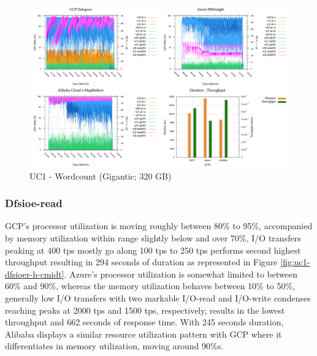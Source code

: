 \documentclass[review]{elsarticle}
\begin{document}
	\begin{figure}[p]
		\caption{UC1 - Wordcount (Gigantic; 320 GB)}
		\label{fig:uc1-wrdcnt-g-cmidt}
		\includegraphics[width=\textwidth]{uc1-wrdcnt-g-cmidt}
		\centering
	\end{figure}
	
	
	\subsubsection{Dfsioe-read}
	GCP's processor utilization is moving roughly between 80\% to 95\%, accompanied by memory utilization within range slightly below and over 70\%, I/O transfers peaking at 400 tps mostly go along 100 tps to 250 tps performs second highest throughput resulting in 294 seconds of duration as represented in Figure \ref{fig:uc1-dfsioer-h-cmidt}. Azure's processor utilization is somewhat limited to between 60\% and 90\%, whereas the memory utilization behaves between 10\% to 50\%, generally low I/O transfers with two markable I/O-read and I/O-write condenses reaching peaks at 2000 tps and 1500 tps, respectively, results in the lowest throughput and 662 seconds of response time. With 245 seconds duration, Alibaba displays a similar resource utilization pattern with GCP where it differentiates in memory utilization, moving around 90\%s.
	
\end{document}

